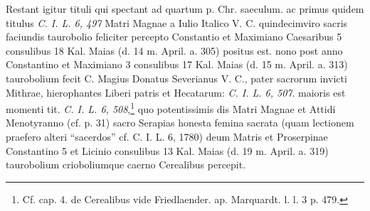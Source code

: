 \documentclass[a4paper, 11pt, oneside, polutonikogreek, german, twocolumn]{article}
\begin{document}
Restant igitur tituli qui spectant ad quartum p. Chr. saeculum. ac primus quidem titulus \emph{C. I. L. 6, 497} Matri Magnae a Iulio Italico V. C. quindecimviro sacris faciundis taurobolio feliciter percepto Constantio et Maximiano Caesaribus 5 consulibus 18 Kal. Maias (d. 14 m. April. a. 305) positus est. nono post anno Constantino et Maximiano 3 consulibus 17 Kal. Maias (d. 15 m. April. a. 313) taurobolium fecit C. Magius Donatus Severianus V. C., pater sacrorum invicti Mithrae, hierophantes Liberi patris et Hecatarum: \emph{C. I. L. 6, 507}. maioris est momenti tit. \emph{C. I. L. 6, 508},\footnote{Cf. cap. 4. de Cerealibus vide Friedlaender. ap. Marquardt. l. l. 3 p. 479.} quo potentissimis dis Matri Magnae et Attidi Menotyranno (cf. p. 31) sacro Serapias honesta femina sacrata (quam lectionem praefero alteri "`sacerdos"' cf. C. I. L. 6, 1780) deum Matris et Proserpinae Constantino 5 et Licinio consulibus 13 Kal. Maias (d. 19 m. April. a. 319) taurobolium crioboliumque caerno Cerealibus percepit.
\end{document}
